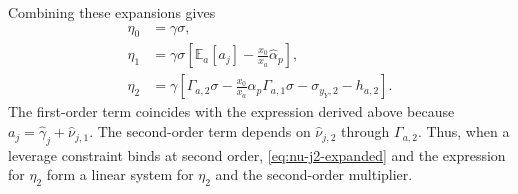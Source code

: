 Combining these expansions gives
\begin{align}
    \eta_0 &= \gamma\sigma,\\
    \eta_1 &= \gamma\sigma\left[\mathbb{E}_a[a_j]-\frac{x_0}{x_a}\hat{\alpha}_p\right],\\
    \eta_2 &= \gamma\left[
        \Gamma_{a,2}\sigma
        -\frac{x_0}{x_a}\hat{\alpha}_p\Gamma_{a,1}\sigma
        -\sigma_{y_Y,2}-h_{a,2}
    \right].
\end{align}
The first-order term coincides with the expression derived above because $a_j=\hat{\gamma}_j+\hat{\nu}_{j,1}$.
The second-order term depends on $\hat{\nu}_{j,2}$ through $\Gamma_{a,2}$.
Thus, when a leverage constraint binds at second order, \eqref{eq:nu-j2-expanded} and the expression for $\eta_2$ form a linear system for $\eta_2$ and the second-order multiplier.




